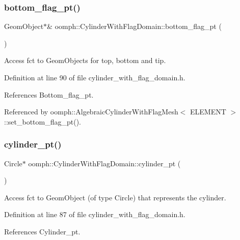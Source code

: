 \subsubsection{\texorpdfstring{bottom\+\_\+flag\+\_\+pt()}{bottom\_flag\_pt()}}
{\footnotesize\ttfamily Geom\+Object$\ast$\& oomph\+::\+Cylinder\+With\+Flag\+Domain\+::bottom\+\_\+flag\+\_\+pt (\begin{DoxyParamCaption}{ }\end{DoxyParamCaption})\hspace{0.3cm}{\ttfamily [inline]}}



Access fct to Geom\+Objects for top, bottom and tip. 



Definition at line 90 of file cylinder\+\_\+with\+\_\+flag\+\_\+domain.\+h.



References Bottom\+\_\+flag\+\_\+pt.



Referenced by oomph\+::\+Algebraic\+Cylinder\+With\+Flag\+Mesh$<$ E\+L\+E\+M\+E\+N\+T $>$\+::set\+\_\+bottom\+\_\+flag\+\_\+pt().

\mbox{\label{classoomph_1_1CylinderWithFlagDomain_a783f430b790953da4e01720be56d1872}} 
\subsubsection{\texorpdfstring{cylinder\+\_\+pt()}{cylinder\_pt()}}
{\footnotesize\ttfamily Circle$\ast$ oomph\+::\+Cylinder\+With\+Flag\+Domain\+::cylinder\+\_\+pt (\begin{DoxyParamCaption}{ }\end{DoxyParamCaption})\hspace{0.3cm}{\ttfamily [inline]}}



Access fct to Geom\+Object (of type Circle) that represents the cylinder. 



Definition at line 87 of file cylinder\+\_\+with\+\_\+flag\+\_\+domain.\+h.



References Cylinder\+\_\+pt.

